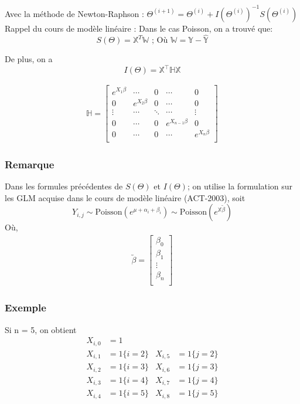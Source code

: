 Avec la méthode de Newton-Raphson : $\Theta^{(i+1)} = \Theta^{(i)} + I(\Theta^{(i)})^{-1}S(\Theta^{(i)})$
Rappel du cours de modèle linéaire : Dans le cas Poisson, on a trouvé que:
$$ S(\Theta) = \mathbb{X}^T \mathbb{W} \text{ ; Où } \mathbb{W} = \mathbb{Y} - \widehat{\mathbb{Y}} $$

De plus, on a
$$
I(\Theta) = \mathbb{X}^\intercal \mathbb{H} \mathbb{X}
$$


\begin{align*}
\mathbb{H} =
\begin{bmatrix} 
e^{X_1 \beta} & \cdots & 0 & \cdots & 0 \\
0  & e^{X_2 \beta} & 0 & \cdots & 0 \\
\vdots & \cdots & \ddots & \cdots & \vdots\\
0 & \cdots & 0 & e^{X_{n-1} \beta} & 0\\
0 & \cdots & 0 & \cdots & e^{X_n \beta}\\
\end{bmatrix}
\end{align*}

\subsubsection*{Remarque}
Dans les formules précédentes de $S(\Theta)$ et $I(\Theta)$; on utilise la formulation sur les GLM acquise dans le cours de modèle linéaire (ACT-2003), soit
$$
Y_{i,j} \sim \text{Poisson}(e^{\mu + \alpha_i + \beta_i}) \sim \text{Poisson}(e^{\mathbb{X} \utilde{\beta}})
$$
Où,
\begin{align*}
\utilde{\beta}=
\begin{bmatrix} 
\beta_0 \\
\beta_1 \\
\vdots \\
\beta_n \\
\end{bmatrix}
\end{align*}

\subsubsection*{Exemple}
Si n = 5, on obtient
\begin{align*}
X_{i,0} &= 1 \\
X_{i,1} &= 1\lbrace i = 2 \rbrace     & X_{i,5} &= 1\lbrace j = 2 \rbrace\\
X_{i,2} &= 1\lbrace i = 3 \rbrace     & X_{i,6} &= 1\lbrace j = 3 \rbrace\\
X_{i,3} &= 1\lbrace i = 4 \rbrace     & X_{i,7} &= 1\lbrace j = 4 \rbrace\\
X_{i,4} &= 1\lbrace i = 5 \rbrace     & X_{i,8} &= 1\lbrace j = 5 \rbrace\\
\end{align*}

